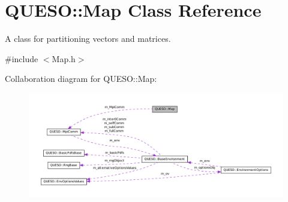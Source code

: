 \hypertarget{class_q_u_e_s_o_1_1_map}{\section{Q\-U\-E\-S\-O\-:\-:Map Class Reference}
\label{class_q_u_e_s_o_1_1_map}
}


A class for partitioning vectors and matrices.  




{\ttfamily \#include $<$Map.\-h$>$}



Collaboration diagram for Q\-U\-E\-S\-O\-:\-:Map\-:
\nopagebreak
\begin{figure}[H]
\begin{center}
\leavevmode
\includegraphics[width=350pt]{class_q_u_e_s_o_1_1_map__coll__graph}
\end{center}
\end{figure}
